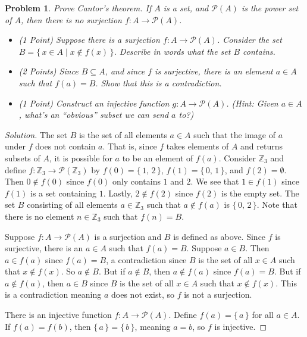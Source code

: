 \documentclass{article}
\theoremstyle{normal}
\newtheorem{problem}{Problem}
\begin{document}
    \clearpage
    \color{blue}
    \begin{problem}
        Prove Cantor's theorem. If $A$ is a set, and $\mathcal{P}(A)$ is the
        power set of $A$, then there is no surjection
        $f:A\rightarrow\mathcal{P}(A)$.
        \begin{itemize}
            \item (1 Point) Suppose there is a surjection
                $f:A\rightarrow\mathcal{P}(A)$. Consider the set
                $B=\{\,x\in{A}\;|\;x\notin{f}(x)\,\}$. Describe in words what
                the set $B$ contains.
            \item (2 Points) Since $B\subseteq{A}$, and since $f$ is surjective,
                there is an element $a\in{A}$ such that $f(a)=B$. Show that
                this is a contradiction.
            \item (1 Point) Construct an injective function
                $g:A\rightarrow\mathcal{P}(A)$. (Hint: Given $a\in{A}$, what's
                an ``obvious'' subset we can send $a$ to?)
        \end{itemize}
    \end{problem}
    \color{black}
    \begin{proof}[Solution]
        The set $B$ is the set of all elements $a\in{A}$ such that the image of
        $a$ under $f$ does not contain $a$. That is, since $f$ takes elements
        of $A$ and returns subsets of $A$, it is possible for $a$ to be
        an element of $f(a)$. Consider $\mathbb{Z}_{3}$ and define
        $f:\mathbb{Z}_{3}\rightarrow\mathcal{P}(\mathbb{Z}_{3})$ by
        $f(0)=\{\,1,\,2\,\}$, $f(1)=\{\,0,\,1\,\}$, and
        $f(2)=\emptyset$. Then $0\notin{f}(0)$ since $f(0)$ only contains
        $1$ and $2$. We see that $1\in{f}(1)$ since $f(1)$ is a set containing
        $1$. Lastly, $2\notin{f}(2)$ since $f(2)$ is the empty set. The set
        $B$ consisting of all elements $a\in\mathbb{Z}_{3}$ such that
        $a\notin{f}(a)$ is $\{\,0,\,2\,\}$. Note that there is no element
        $n\in\mathbb{Z}_{3}$ such that $f(n)=B$.
        \par\hfill\par
        Suppose $f:A\rightarrow\mathcal{P}(A)$ is a surjection and $B$ is
        defined as above. Since $f$ is surjective, there is an $a\in{A}$
        such that $f(a)=B$. Suppose $a\in{B}$. Then $a\in{f}(a)$ since
        $f(a)=B$, a contradiction since $B$ is the set of all $x\in{A}$ such
        that $x\notin{f}(x)$. So $a\notin{B}$. But if $a\notin{B}$, then
        $a\notin{f}(a)$ since $f(a)=B$. But if $a\notin{f}(a)$, then
        $a\in{B}$ since $B$ is the set of all $x\in{A}$ such that
        $x\notin{f}(x)$. This is a contradiction meaning $a$ does not exist, so
        $f$ is not a surjection.
        \par\hfill\par
        There is an injective function $f:A\rightarrow\mathcal{P}(A)$.
        Define $f(a)=\{\,a\,\}$ for all $a\in{A}$. If
        $f(a)=f(b)$, then $\{\,a\,\}=\{\,b\,\}$, meaning $a=b$, so $f$
        is injective.
    \end{proof}
\end{document}
